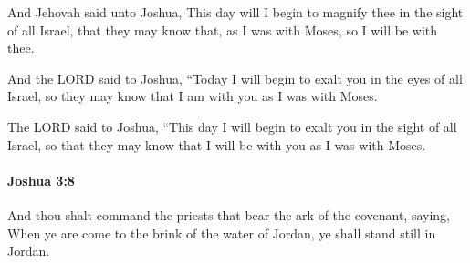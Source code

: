 			\begin{versebox}
					\item[BHS] 
					\item[ASV] And Jehovah said unto Joshua, This day will I begin to magnify thee in the sight of all Israel, that they may know that, as I was with Moses, so I will be with thee.
					\item[NIV] And the LORD said to Joshua, “Today I will begin to exalt you in the eyes of all Israel, so they may know that I am with you as I was with Moses.
					\item[NRSV] The LORD said to Joshua, “This day I will begin to exalt you in the sight of all Israel, so that they may know that I will be with you as I was with Moses.
			\end{versebox}

		\paragraph{Joshua 3:8} %
			\label{JOSHUA-3-8}

			And thou shalt command the priests that bear the ark of the covenant, saying, When ye are come to the brink of the water of Jordan, ye shall stand still in Jordan.

